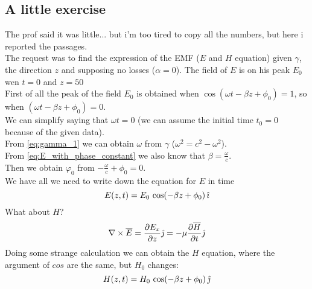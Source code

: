 \subsection*{A little exercise}
The prof said it was little... but i'm too tired to copy all the numbers, but here i reported the passages.\\
 The request was to find the expression of the EMF ($E$ and $H$ equation) given $\gamma $, the direction $z$ and supposing no losses ($\alpha=0$). The field of $E$ is on his peak $E_0$ wen $t=0$ and $z=50$\\
 First of all the peak of the field $E_0$ is obtained when $\cos(\omega t-\beta z +\phi_0)=1$, so when $(\omega t-\beta z +\phi_0)=0$.\\
 We can simplify saying that $\omega t =0$ (we can assume the initial time $t_0=0$ because of the given data).\\
 From \cref{eq:gamma_1} we can obtain $\omega$ from $\gamma$ ($\omega^2=c^2-\omega^2$).\\
 From \cref{eq:E_with_phase_constant} we also know that $\beta=\frac{\omega}{c}$.\\
Then we obtain $\varphi_0$ from $-\frac{\omega}{c}+\phi_0=0$.\\
We have all we need to write down the equation for $E$ in time
\begin{equation*}
    E(z,t)=E_0\, \cos(-\beta z +\phi_0)\,\hat{\imath}
\end{equation*}
What about $H$?
\begin{equation}
    \nabla\times \overline{E}=\frac{\partial E_x}{\partial z}\hat{\jmath}=-\mu\frac{\partial \overline{H}}{\partial t}\hat{\jmath}
\end{equation}
Doing some strange calculation we can obtain the $H$ equation, where the argument of $cos$ are the same, but $H_0$ changes:
\begin{equation*}
    H(z,t)=H_0\, \cos(-\beta z +\phi_0)\,\hat{\jmath}
\end{equation*}
